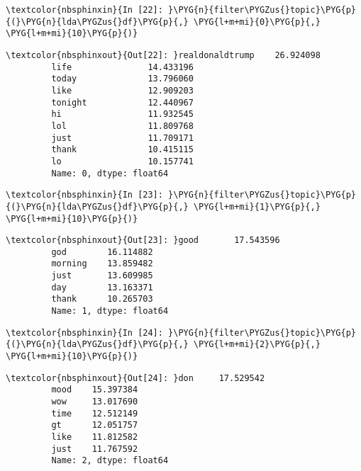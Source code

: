 \documentclass[letterpaper,10pt,english]{sphinxmanual}
\begin{document}
%
\begin{Verbatim}[commandchars=\\\{\}]
\textcolor{nbsphinxin}{In [22]: }\PYG{n}{filter\PYGZus{}topic}\PYG{p}{(}\PYG{n}{lda\PYGZus{}df}\PYG{p}{,} \PYG{l+m+mi}{0}\PYG{p}{,} \PYG{l+m+mi}{10}\PYG{p}{)}
\end{Verbatim}

%
\begin{Verbatim}[commandchars=\\\{\}]
\textcolor{nbsphinxout}{Out[22]: }realdonaldtrump    26.924098
         life               14.433196
         today              13.796060
         like               12.909203
         tonight            12.440967
         hi                 11.932545
         lol                11.809768
         just               11.709171
         thank              10.415115
         lo                 10.157741
         Name: 0, dtype: float64
\end{Verbatim}

%
\begin{Verbatim}[commandchars=\\\{\}]
\textcolor{nbsphinxin}{In [23]: }\PYG{n}{filter\PYGZus{}topic}\PYG{p}{(}\PYG{n}{lda\PYGZus{}df}\PYG{p}{,} \PYG{l+m+mi}{1}\PYG{p}{,} \PYG{l+m+mi}{10}\PYG{p}{)}
\end{Verbatim}

%
\begin{Verbatim}[commandchars=\\\{\}]
\textcolor{nbsphinxout}{Out[23]: }good       17.543596
         god        16.114882
         morning    13.859482
         just       13.609985
         day        13.163371
         thank      10.265703
         Name: 1, dtype: float64
\end{Verbatim}

%
\begin{Verbatim}[commandchars=\\\{\}]
\textcolor{nbsphinxin}{In [24]: }\PYG{n}{filter\PYGZus{}topic}\PYG{p}{(}\PYG{n}{lda\PYGZus{}df}\PYG{p}{,} \PYG{l+m+mi}{2}\PYG{p}{,} \PYG{l+m+mi}{10}\PYG{p}{)}
\end{Verbatim}

%
\begin{Verbatim}[commandchars=\\\{\}]
\textcolor{nbsphinxout}{Out[24]: }don     17.529542
         mood    15.397384
         wow     13.017690
         time    12.512149
         gt      12.051757
         like    11.812582
         just    11.767592
         Name: 2, dtype: float64
\end{Verbatim}
\end{document}
